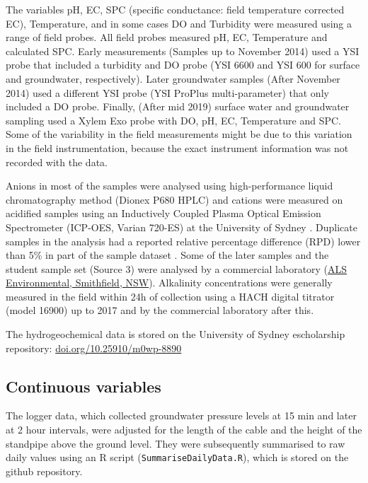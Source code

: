 \documentclass[, manuscript]{copernicus}
\begin{document}
The variables pH, EC, SPC (specific conductance: field temperature
corrected EC), Temperature, and in some cases DO and Turbidity were
measured using a range of field probes. All field probes measured pH,
EC, Temperature and calculated SPC. Early measurements (Samples up to
November 2014) used a YSI probe that included a turbidity and DO probe
(YSI 6600 and YSI 600 for surface and groundwater, respectively). Later
groundwater samples (After November 2014) used a different YSI probe
(YSI ProPlus multi-parameter) that only included a DO probe. Finally,
(After mid 2019) surface water and groundwater sampling used a Xylem Exo
probe with DO, pH, EC, Temperature and SPC. Some of the variability in
the field measurements might be due to this variation in the field
instrumentation, because the exact instrument information was not
recorded with the data.

Anions in most of the samples were analysed using high-performance
liquid chromatography method (Dionex P680 HPLC) and cations were
measured on acidified samples using an Inductively Coupled Plasma
Optical Emission Spectrometer (ICP-OES, Varian 720-ES) at the University
of Sydney \citep{Akter2018}. Duplicate samples in the analysis had a
reported relative percentage difference (RPD) lower than 5\% in part of
the sample dataset \citep{Akter2018}. Some of the later samples and the
student sample set (Source 3) were analysed by a commercial laboratory
(\href{https://www.alsglobal.com/en/locations/asia-pacific/pacific/australia/nsw/sydney-woodpark-environmental}{ALS
Environmental, Smithfield, NSW}). Alkalinity concentrations were
generally measured in the field within 24h of collection using a HACH
digital titrator (model 16900) \citep{Akter2018} up to 2017 and by the
commercial laboratory after this.

The hydrogeochemical data is stored on the University of Sydney
escholarship repository: \url{doi.org/10.25910/m0wp-8890}

\subsection{Continuous variables}

The logger data, which collected groundwater pressure levels at 15 min
and later at 2 hour intervals, were adjusted for the length of the cable
and the height of the standpipe above the ground level. They were
subsequently summarised to raw daily values using an R script
(\texttt{SummariseDailyData.R}), which is stored on the github
repository.
\end{document}
